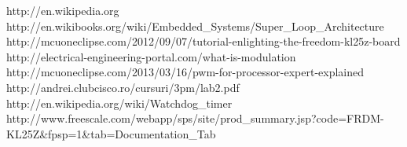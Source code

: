 \renewcommand*{\refname}{Referințe bibliografice}

\begin{thebibliography}{00}
\bibitem{} http://en.wikipedia.org
\bibitem{} http://en.wikibooks.org/wiki/Embedded\_Systems/Super\_Loop\_Architecture
\bibitem{} http://mcuoneclipse.com/2012/09/07/tutorial-enlighting-the-freedom-kl25z-board
\bibitem{} http://electrical-engineering-portal.com/what-is-modulation
\bibitem{} http://mcuoneclipse.com/2013/03/16/pwm-for-processor-expert-explained
 http://andrei.clubcisco.ro/cursuri/3pm/lab2.pdf
 http://en.wikipedia.org/wiki/Watchdog\_timer
\bibitem{} http://www.freescale.com/webapp/sps/site/prod\_summary.jsp?code=FRDM-KL25Z\&fpsp=1\&tab=Documentation\_Tab
\end{thebibliography}

